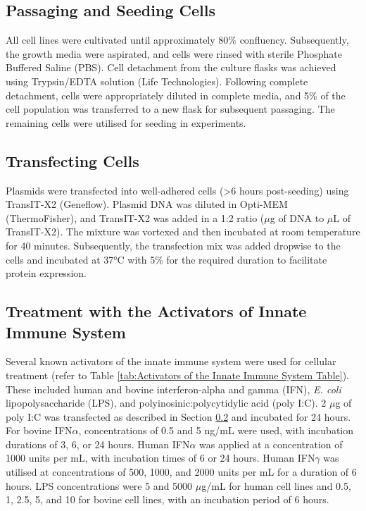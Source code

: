 \subsection{Passaging and Seeding Cells} \label{subsec:Passaging and Seeding Cells}
All cell lines were cultivated until approximately 80\% confluency. Subsequently, the growth media were aspirated, and cells were rinsed with sterile Phosphate Buffered Saline (PBS). Cell detachment from the culture flasks was achieved using Trypsin/EDTA solution (Life Technologies). Following complete detachment, cells were appropriately diluted in complete media, and 5\% of the cell population was transferred to a new flask for subsequent passaging. The remaining cells were utilised for seeding in experiments.

\subsection{Transfecting Cells} \label{subsec:Transfecting Cells}
Plasmids were transfected into well-adhered cells (>6 hours post-seeding) using TransIT-X2 (Geneflow). Plasmid DNA was diluted in Opti-MEM (ThermoFisher), and TransIT-X2 was added in a 1:2 ratio ($\mu$g of DNA to $\mu$L of TransIT-X2). The mixture was vortexed and then incubated at room temperature for 40 minutes. Subsequently, the transfection mix was added dropwise to the cells and incubated at 37°C with 5\%  for the required duration to facilitate protein expression.


\subsection{Treatment with the Activators of Innate Immune System} \label{subsec:Treatment with the Activators of Innate Immune System}
Several known activators of the innate immune system were used for cellular treatment (refer to Table \ref{tab:Activators of the Innate Immune System Table}). These included human and bovine interferon-alpha and gamma (IFN), \textit{E. coli} lipopolysaccharide (LPS), and polyinosinic:polycytidylic acid (poly I:C). 2 $\mu$g of poly I:C was transfected as described in Section \ref{subsec:Transfecting Cells} and incubated for 24 hours. For bovine IFN$\alpha$, concentrations of 0.5 and 5 ng/mL were used, with incubation durations of 3, 6, or 24 hours. Human IFN$\alpha$ was applied at a concentration of 1000 units per mL, with incubation times of 6 or 24 hours. Human IFN$\gamma$ was utilised at concentrations of 500, 1000, and 2000 units per mL for a duration of 6 hours. LPS concentrations were 5 and 5000 $\mu$g/mL for human cell lines and 0.5, 1, 2.5, 5, and 10 for bovine cell lines, with an incubation period of 6 hours.

